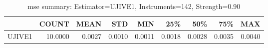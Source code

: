 \begin{table}[ht]
\centering
\caption{mse summary: Estimator=UJIVE1, Instruments=142, Strength=0.90}
\begin{tabular}{lrrrrrrrr}
\toprule
 & COUNT & MEAN & STD & MIN & 25\% & 50\% & 75\% & MAX \\
\midrule
UJIVE1 & 10.0000 & 0.0027 & 0.0010 & 0.0011 & 0.0018 & 0.0028 & 0.0035 & 0.0040 \\
\bottomrule
\end{tabular}
\end{table}
